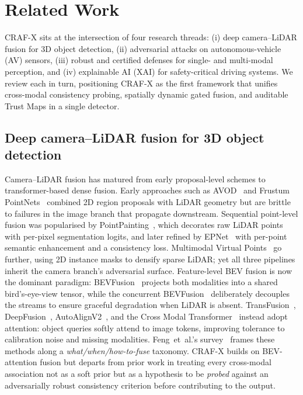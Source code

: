 \section{Related Work}
\label{sec:related}

CRAF-X sits at the intersection of four research threads: (i) deep
camera--LiDAR fusion for 3D object detection, (ii) adversarial attacks on
autonomous-vehicle (AV) sensors, (iii) robust and certified defenses for
single- and multi-modal perception, and (iv) explainable AI (XAI) for
safety-critical driving systems. We review each in turn, positioning
CRAF-X as the first framework that unifies cross-modal consistency
probing, spatially dynamic gated fusion, and auditable Trust Maps in a
single detector.

\subsection{Deep camera--LiDAR fusion for 3D object detection}

Camera--LiDAR fusion has matured from early proposal-level schemes to
transformer-based dense fusion. Early approaches such as
AVOD~\cite{KuAVOD2018} and Frustum PointNets~\cite{QiFrustum2018}
combined 2D region proposals with LiDAR geometry but are brittle to
failures in the image branch that propagate downstream. Sequential
point-level fusion was popularised by PointPainting~\cite{VoraPointPainting2020},
which decorates raw LiDAR points with per-pixel segmentation logits, and
later refined by EPNet~\cite{HuangEPNet2020} with per-point semantic
enhancement and a consistency loss. Multimodal Virtual
Points~\cite{YinMVP2021} go further, using 2D instance masks to
densify sparse LiDAR; yet all three pipelines inherit the camera
branch's adversarial surface.
Feature-level BEV fusion is now the dominant paradigm:
BEVFusion~\cite{LiuBEVFusion2023} projects both modalities into a shared
bird's-eye-view tensor, while the concurrent
BEVFusion~\cite{LiangBEVFusion2022} deliberately decouples the streams
to ensure graceful degradation when LiDAR is absent.
TransFusion~\cite{BaiTransFusion2022},
DeepFusion~\cite{LiDeepFusion2022},
AutoAlignV2~\cite{ChenAutoAlignV22022}, and the Cross Modal
Transformer~\cite{YanCMT2023} instead adopt attention: object queries
softly attend to image tokens, improving tolerance to calibration noise
and missing modalities. Feng~et~al.'s survey~\cite{FengSurvey2021}
frames these methods along a \emph{what/when/how-to-fuse} taxonomy.
CRAF-X builds on BEV-attention fusion but departs from prior work in
treating every cross-modal association not as a soft prior but as a
hypothesis to be \emph{probed} against an adversarially robust
consistency criterion before contributing to the output.

